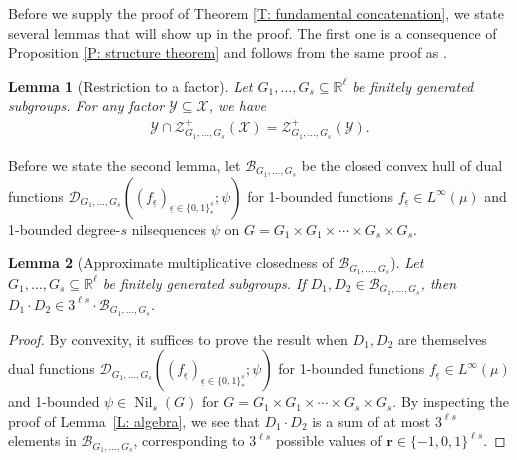\documentclass[11pt]{amsart}
\newtheorem{lemma}{Lemma}[section]
\theoremstyle{definition}
\DeclareMathOperator*{\E}{\mathbb{E}}
\newcommand{\R}{{\mathbb R}}
\newcommand{\CB}{{\mathcal B}}
\newcommand{\CD}{{\mathcal D}}
\newcommand{\CX}{{\mathcal X}}
\newcommand{\CY}{{\mathcal Y}}
\newcommand{\CZ}{{\mathcal Z}}
\newcommand{\br}{{\mathbf{r}}}
\newcommand{\ueps}{{\underline{\epsilon}}}
\newcommand{\1}{{\mathbf{1}}}
\DeclareMathOperator{\Nil}{Nil}
\begin{document}
Before we supply the proof of Theorem \ref{T: fundamental concatenation}, we state several lemmas that will show up in the proof. The first one is a consequence of Proposition \ref{P: structure theorem} and follows from the same proof as \cite[Corollary 2.5]{TZ16}.
\begin{lemma}[Restriction to a factor]\label{L: substituting factor}
    Let $G_1, \ldots, G_s\subseteq\R^\ell$ be finitely generated subgroups. %
    For any factor $\CY\subseteq\CX$, we have
    \begin{align*}
        \CY \cap \CZ^+_{G_1, \ldots, G_s}(\CX) = \CZ^+_{G_1, \ldots, G_s}(\CY).
    \end{align*}
\end{lemma}
    

Before we state the second lemma, let $\CB_{G_1, \ldots, G_s}$ be the closed convex hull of dual functions $\CD_{G_1,\dots,G_{s}}((f_{\ueps})_{\ueps\in\{0,1\}^{s}_{\ast}};\psi)$ for 1-bounded functions $f_\ueps\in L^\infty(\mu)$ and 1-bounded degree-$s$ nilsequences $\psi$ on $G = G_1\times G_1\times \cdots \times G_s\times G_s$.
\begin{lemma}[Approximate multiplicative closedness of $\CB_{G_1, \ldots, G_s}$]\label{L: convex hull}
    Let $G_1, \ldots, G_s\subseteq\R^\ell$ be finitely generated subgroups.
    If $D_1, D_2\in \CB_{G_1, \ldots, G_s}$, then $D_1\cdot D_2\in 3^{\ell s}\cdot \CB_{G_1, \ldots, G_s}$.
\end{lemma}
\begin{proof}
    By convexity, it suffices to prove the result when $D_1, D_2$ are themselves dual functions $\CD_{G_1,\dots,G_{s}}((f_{\ueps})_{\ueps\in\{0,1\}^{s}_{\ast}};\psi)$ for 1-bounded functions $f_\ueps\in L^\infty(\mu)$ and 1-bounded %
    $\psi\in\Nil_s(G)$ for $G = G_1\times G_1\times \cdots \times G_s\times G_s$. By inspecting the proof of Lemma~\ref{L: algebra}, we see that $D_1\cdot D_2$ is a sum of at most $3^{\ell s}$ elements in $\CB_{G_1, \ldots, G_s}$, corresponding to $3^{\ell s}$ possible values of $\br\in\{-1,0,1\}^{\ell s}$.
\end{proof}
\end{document}
